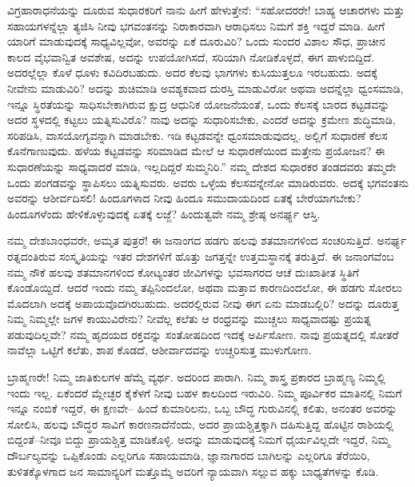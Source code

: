 ವಿಗ್ರಹಾರಾಧನೆಯನ್ನು ದೂರುವ ಸುಧಾರಕರಿಗೆ ನಾನು ಹೀಗೆ ಹೇಳುತ್ತೇನೆ: “ಸಹೋದರರೇ! ಬಾಹ್ಯ ಆಚಾರಗಳು ಮತ್ತು ಸಹಾಯಗಳನ್ನೆಲ್ಲಾ ತ್ಯಜಿಸಿ ನೀವು ಭಗವಂತನನ್ನು ನಿರಾಕಾರವಾಗಿ ಆರಾಧಿಸಲು ನಿಮಗೆ ಶಕ್ತಿ ಇದ್ದರೆ ಮಾಡಿ. ಹೀಗೆ ಯಾರಿಗೆ ಮಾಡುವುದಕ್ಕೆ ಸಾಧ್ಯವಿಲ್ಲವೋ, ಅವರನ್ನು ಏಕೆ ದೂರುವಿರಿ? ಒಂದು ಸುಂದರ ವಿಶಾಲ ಸೌಧ, ಪ್ರಾಚೀನ ಕಾಲದ ವೈಭವಾನ್ವಿತ ಅವಶೇಷ, ಅದನ್ನು ಉಪಯೋಗಿಸದೆ, ಸರಿಯಾಗಿ ನೋಡಿಕೊಳ್ಳದೆ, ಈಗ ಪಾಳುಬಿದ್ದಿದೆ. ಅದರಲ್ಲೆಲ್ಲಾ ಕೊಳೆ ಧೂಳು ಕವಿದಿರಬಹುದು. ಅದರ ಕೆಲವು ಭಾಗಗಳು ಕುಸಿಯುತ್ತಲೂ ಇರಬಹುದು. ಅದಕ್ಕೆ ನೀವೇನು ಮಾಡುವಿರಿ? ಅದನ್ನು ಶುಚಿಮಾಡಿ ಅವಶ್ಯಕವಾದ ದುರಸ್ತಿ ಮಾಡುವಿರೋ ಅಥವಾ ಅದನ್ನೆಲ್ಲಾ ಧ್ವಂಸಮಾಡಿ, ಇನ್ನೂ ಸ್ಥಿರತೆಯನ್ನು ಸಾಧಿಸಬೇಕಾಗಿರುವ ಕ್ಷುದ್ರ ಆಧುನಿಕ ಯೋಜನೆಯಂತೆ, ಒಂದು ಕೆಲಸಕ್ಕೆ ಬಾರದ ಕಟ್ಟಡವನ್ನು ಅದರ ಸ್ಥಳದಲ್ಲಿ ಕಟ್ಟಲು ಯತ್ನಿಸುವಿರೊ? ನಾವು ಅದನ್ನು ಸುಧಾರಿಸಬೇಕು, ಎಂದರೆ ಅದನ್ನು ಕ್ರಮೇಣ ಶುದ್ಧಿಮಾಡಿ, ಸರಿಪಡಿಸಿ, ವಾಸಯೋಗ್ಯವನ್ನಾಗಿ ಮಾಡಬೇಕು. ಇಡಿ ಕಟ್ಟಡವನ್ನೇ ಧ್ವಂಸಮಾಡುವುದಲ್ಲ. ಅಲ್ಲಿಗೆ ಸುಧಾರಣೆ ಕೆಲಸ ಕೊನೆಗಾಣುವುದು. ಹಳೆಯ ಕಟ್ಟಡವನ್ನು ಸರಿಮಾಡಿದ ಮೇಲೆ ಆ ಸುಧಾರಣೆಯಿಂದ ಮತ್ತೇನು ಪ್ರಯೋಜನ? ಈ ಸುಧಾರಣೆಯನ್ನು ಸಾಧ್ಯವಾದರೆ ಮಾಡಿ, ಇಲ್ಲದಿದ್ದರೆ ಸುಮ್ಮನಿರಿ.” ನಮ್ಮ ದೇಶದ ಸುಧಾರಕರ ತಂಡದವರು ತಮ್ಮದೇ ಒಂದು ಪಂಗಡವನ್ನು ಸ್ಥಾಪಿಸಲು ಯತ್ನಿಸುವರು. ಅವರು ಒಳ್ಳೆಯ ಕೆಲಸವನ್ನೇನೋ ಮಾಡಿರುವರು. ಅದಕ್ಕೆ ಭಗವಂತನು ಅವರನ್ನು ಆಶೀರ್ವದಿಸಲಿ! ಹಿಂದೂಗಳಾದ ನೀವು ಹಿಂದೂ ಸಮುದಾಯದಿಂದ ಏತಕ್ಕೆ ಬೇರೆಯಾಗಬೇಕು? ಹಿಂದೂಗಳೆಂದು ಹೇಳಿಕೊಳ್ಳುವುದಕ್ಕೆ ಏತಕ್ಕೆ ಲಜ್ಜೆ? ಹಿಂದುತ್ವವೇ ನಮ್ಮ ಶ್ರೇಷ್ಠ ಅನರ್ಘ್ಯ ಆಸ್ತಿ. 

ನಮ್ಮ ದೇಶಬಾಂಧವರೇ, ಅಮೃತ ಪುತ್ರರೆ! ಈ ಜನಾಂಗದ ಹಡಗು ಹಲವು ಶತಮಾನಗಳಿಂದ ಸಂಚರಿಸುತ್ತಿದೆ. ಅನರ್ಘ್ಯ ರತ್ನದಂತಿರುವ ಸಂಸ್ಕೃತಿಯನ್ನು ಇತರ ದೇಶಗಳಿಗೆ ಹೊತ್ತು ಜಗತ್ತನ್ನೇ ಉತ್ತಮಸ್ಥಾನಕ್ಕೆ ತರುತ್ತಿದೆ. ಈ ಜನಾಂಗವೆಂಬ ನಮ್ಮ ನೌಕೆ ಹಲವು ಶತಮಾನಗಳಿಂದ ಕೋಟ್ಯಂತರ ಜೀವಿಗಳನ್ನು ಭವಸಾಗರದ ಆಚೆ ದುಃಖಾತೀತ ಸ್ಥಿತಿಗೆ ಕೊಂಡೊಯ್ದಿದೆ. ಆದರೆ ಇಂದು ನಮ್ಮ ತಪ್ಪಿನಿಂದಲೋ, ಅಥವಾ ಮತ್ತಾವ ಕಾರಣದಿಂದಲೋ, ಈ ಹಡಗು ಸೋರಲು ಮೊದಲಾಗಿ ಅದಕ್ಕೆ ಅಪಾಯವೊದಗಿರಬಹುದು. ಅದರಲ್ಲಿರುವ ನೀವು ಈಗ ಏನು ಮಾಡಬಲ್ಲಿರಿ? ಅದನ್ನು ದೂರುತ್ತ ನಿಮ್ಮ ನಿಮ್ಮಲ್ಲೇ ಜಗಳ ಕಾಯುವಿರೇನು? ನೀವೆಲ್ಲ ಕಲೆತು ಆ ರಂಧ್ರವನ್ನು ಮುಚ್ಚಲು ಸಾಧ್ಯವಾದಷ್ಟು ಪ್ರಯತ್ನ ಪಡುವುದಿಲ್ಲವೇ? ನಮ್ಮ ಹೃದಯದ ರಕ್ತವನ್ನು ಸಂತೋಷದಿಂದ ಇದಕ್ಕೆ ಅರ್ಪಿಸೋಣ. ನಾವು ಪ್ರಯತ್ನದಲ್ಲಿ ಸೋತರೆ ನಾವೆಲ್ಲಾ ಒಟ್ಟಿಗೆ ಕಲೆತು, ಶಾಪ ಕೊಡದೆ, ಆಶೀರ್ವಾದವನ್ನು ಉಚ್ಚರಿಸುತ್ತ ಮುಳುಗೋಣ. 

ಬ್ರಾಹ್ಮಣರೇ! ನಿಮ್ಮ ಜಾತಿಕುಲಗಳ ಹೆಮ್ಮೆ ವ್ಯರ್ಥ. ಅದರಿಂದ ಪಾರಾಗಿ. ನಿಮ್ಮ ಶಾಸ್ತ್ರ ಪ್ರಕಾರದ ಬ್ರಾಹ್ಮಣ್ಯ ನಿಮ್ಮಲ್ಲಿ ಇಂದು ಇಲ್ಲ. ಏಕೆಂದರೆ ಮ್ಲೇಚ್ಛರ ಕೈಕೆಳಗೆ ನೀವು ಬಹಳ ಕಾಲದಿಂದ ಇರುವಿರಿ. ನಿಮ್ಮ ಪೂರ್ವಿಕರ ಮಾತಿನಲ್ಲಿ ನಿಮಗೆ ಇನ್ನೂ ನಂಬಿಕೆ ಇದ್ದರೆ, ಈ ಕ್ಷಣವೇ– ಹಿಂದೆ ಕುಮಾರಿಲನು, ಒಬ್ಬ ಬೌದ್ಧ ಗುರುವಿನಲ್ಲಿ ಕಲಿತು, ಅನಂತರ ಅವರನ್ನು ಸೋಲಿಸಿ, ಹಲವು ಬೌದ್ಧರ ಸಾವಿಗೆ ಕಾರಣನಾದೆನೆಂದು, ಅದರ ಪ್ರಾಯಶ್ಚಿತ್ತಕ್ಕಾಗಿ ದಹಿಸುತ್ತಿದ್ದ ಹೊಟ್ಟಿನ ರಾಶಿಯಲ್ಲಿ ಬಿದ್ದಂತೆ–ನೀವೂ ಬಿದ್ದು ಪ್ರಾಯಶ್ಚಿತ್ತ ಮಾಡಿಕೊಳ್ಳಿ. ಅದನ್ನು ಮಾಡುವುದಕ್ಕೆ ನಿಮಗೆ ಧೈರ್ಯವಿಲ್ಲದೇ ಇದ್ದರೆ, ನಿಮ್ಮ ದೌರ್ಬಲ್ಯವನ್ನು ಒಪ್ಪಿಕೊಂಡು ಎಲ್ಲರಿಗೂ ಸಹಾಯಮಾಡಿ, ಜ್ಞಾನಾಗಾರದ ಬಾಗಿಲನ್ನು ಎಲ್ಲರಿಗೂ ತೆರೆಯಿರಿ, ತುಳಿತಕ್ಕೊಳಗಾದ ಜನ ಸಾಮಾನ್ಯರಿಗೆ ಮತ್ತೊಮ್ಮೆ ಅವರಿಗೆ ನ್ಯಾಯವಾಗಿ ಸಲ್ಲುವ ಹಕ್ಕು ಬಾಧ್ಯತೆಗಳನ್ನು ಕೊಡಿ. 

